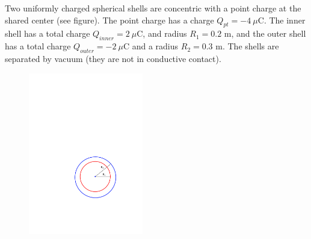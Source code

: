 \question Two uniformly charged spherical shells are concentric with a point charge at the shared center (see figure). The point charge has a charge $Q_{pt} = -4\ \mu$C. The inner shell has a total charge $Q_{inner}=2\ \mu$C, and radius $R_1=0.2$ m, and the outer shell has a total charge $Q_{outer}=-2\ \mu$C and a radius $R_2=0.3$ m. The shells are separated by vacuum (they are not in conductive contact).

\begin{figure}[ht!]
	\centering
	\includegraphics[width=5cm]{concentric}
\end{figure}

